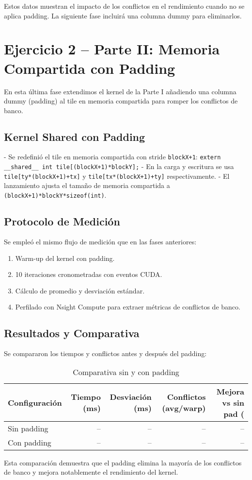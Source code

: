 \documentclass[a4paper,11pt]{article}
\begin{document}
Estos datos muestran el impacto de los conflictos en el rendimiento cuando no se aplica padding. La siguiente fase incluirá una columna dummy para eliminarlos.

\section{Ejercicio 2 – Parte II: Memoria Compartida con Padding}
En esta última fase extendimos el kernel de la Parte I añadiendo una columna dummy (padding) al tile en memoria compartida para romper los conflictos de banco.

\subsection{Kernel Shared con Padding}
- Se redefinió el tile en memoria compartida con stride \texttt{blockX+1}:  
  \texttt{extern __shared__ int tile[(blockX+1)*blockY];}  
- En la carga y escritura se usa \texttt{tile[ty*(blockX+1)+tx]} y \texttt{tile[tx*(blockX+1)+ty]} respectivamente.
- El lanzamiento ajusta el tamaño de memoria compartida a \texttt{(blockX+1)*blockY*sizeof(int)}.

\subsection{Protocolo de Medición}
Se empleó el mismo flujo de medición que en las fases anteriores:
\begin{enumerate}[noitemsep]
  \item Warm-up del kernel con padding.
  \item 10 iteraciones cronometradas con eventos CUDA.
  \item Cálculo de promedio y desviación estándar.
  \item Perfilado con Nsight Compute para extraer métricas de conflictos de banco.
\end{enumerate}

\subsection{Resultados y Comparativa}
Se compararon los tiempos y conflictos antes y después del padding:
\begin{table}[H]
\centering
\caption{Comparativa sin y con padding}
\begin{tabular}{lrrrr}
\toprule
Configuración & Tiempo (ms) & Desviación (ms) & Conflictos (avg/warp) & Mejora vs sin pad (\\%
\midrule
Sin padding  & -- & -- & -- & -- \\
Con padding  & -- & -- & -- & -- \\
\bottomrule
\end{tabular}
\end{table}

Esta comparación demuestra que el padding elimina la mayoría de los conflictos de banco y mejora notablemente el rendimiento del kernel.



\end{document}
